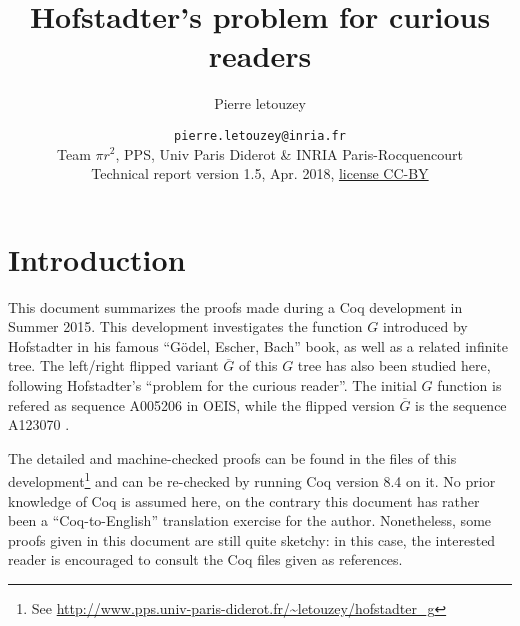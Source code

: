 \documentclass[a4paper,11pt]{article}
\title{Hofstadter's problem for curious readers}
\author{Pierre letouzey}
\date{\small
{\tt pierre.letouzey@inria.fr}\\
Team $\pi r^2$, PPS, Univ Paris Diderot \& INRIA Paris-Rocquencourt\\
Technical report version 1.5, Apr. 2018, \href{http://creativecommons.org/licenses/by/4.0/}{license CC-BY}
}
\begin{document}
\newtheorem{theorem}{Theorem}
\newtheorem{definition}{Definition}
\maketitle


\newcommand{\docgen}[2]{\href{http://www.pps.univ-paris-diderot.fr/~letouzey/hofstadter_g/doc/#1.html#2}{\tt #1.v}}
\newcommand{\doc}[1]{\docgen{#1}{}}
\newcommand{\doclab}[2]{\docgen{#1}{\##2}}
\newcommand{\FG}{\ensuremath{\overline{G}}}
\newcommand{\fibrest}{\ensuremath{\Sigma F_i}}
\newcommand{\flip}{\textit{flip}}
\newcommand{\depth}{\textit{depth}}

\section{Introduction}
This document summarizes the proofs made during a Coq development in
Summer 2015. This development investigates the function $G$ introduced
by Hofstadter in his famous ``Gödel, Escher, Bach'' book\cite{GEB},
as well as a related infinite tree. The left/right flipped variant
$\FG$ of this $G$ tree has also been studied here, following
Hofstadter's ``problem for the curious reader''.
The initial $G$ function is refered as sequence A005206 in
OEIS\cite{OEIS-G}, while the flipped version $\FG$ is the sequence
A123070 \cite{OEIS-FG}.

The detailed and machine-checked proofs can be found in the files
of this development\footnote{See
\url{http://www.pps.univ-paris-diderot.fr/~letouzey/hofstadter_g}}
and can be re-checked by running Coq \cite{Coq} version 8.4 on it.
No prior knowledge of Coq is assumed here, on the contrary this
document has rather been a ``Coq-to-English'' translation
exercise for the author. Nonetheless, some proofs given in this
document are still quite sketchy: in this case, the interested
reader is encouraged to consult the Coq files given as references.
\end{document}
